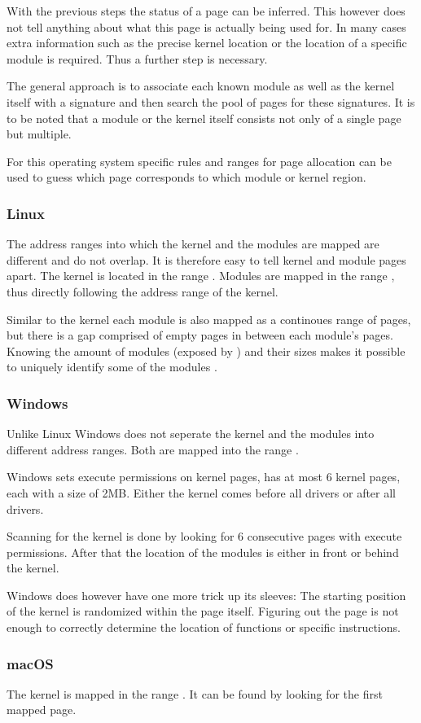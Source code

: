 With the previous steps the status of a page can be inferred.
This however does not tell anything about what this page is actually being used for.
In many cases extra information such as the precise kernel location or the location of a specific module is required.
Thus a further step is necessary.

The general approach is to associate each known module as well as the kernel itself with a signature and then search the pool of pages for these signatures.
It is to be noted that a module or the kernel itself consists not only of a single page but multiple.

For this operating system specific rules and ranges for page allocation can be used to guess which page corresponds to which module or kernel region.

\subsubsection{Linux}

The address ranges into which the kernel and the modules are mapped are different and do not overlap.
It is therefore easy to tell kernel and module pages apart.
The kernel is located in the range \code{[0xffffffff80000000, 0xffffffffc0000000)}.
Modules are mapped in the range , thus directly following the address range of the kernel.

Similar to the kernel each module is also mapped as a continoues range of pages, but there is a gap comprised of empty pages in between each module's pages.
Knowing the amount of modules (exposed by ) and their sizes makes it possible to uniquely identify some of the modules \cite{drk}.

\subsubsection{Windows}
Unlike Linux Windows does not seperate the kernel and the modules into different address ranges.
Both are mapped into the range .

Windows sets execute permissions on kernel pages, has at most 6 kernel pages, each with a size of 2MB.
Either the kernel comes before all drivers or after all drivers.

Scanning for the kernel is done by looking for 6 consecutive pages with execute permissions.
After that the location of the modules is either in front or behind the kernel.\cite{drk}

Windows does however have one more trick up its sleeves: The starting position of the kernel is randomized within the page itself.
Figuring out the page is not enough to correctly determine the location of functions or specific instructions.\cite{blog-windows-10-kaslr}

\subsubsection{macOS}

The kernel is mapped in the range .
It can be found by looking for the first mapped page.\cite{drk}
